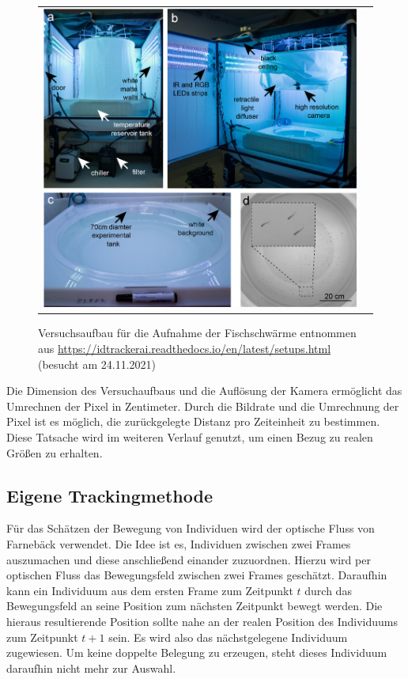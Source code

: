 \begin{figure}[H]
\centering
\begin{tabular}{cc}
\includegraphics[width=1.0\textwidth]{figures/Experimente/Tracking/Experimentaufbau.png} 

\end{tabular}
\caption{Versuchsaufbau für die Aufnahme der Fischschwärme entnommen aus \url{https://idtrackerai.readthedocs.io/en/latest/setups.html} (besucht am 24.11.2021) \label{fig:Versuchsaufbau}  }
\end{figure}

Die Dimension des Versuchaufbaus und die Auflösung der Kamera ermöglicht das Umrechnen der Pixel in Zentimeter.
Durch die Bildrate und die Umrechnung der Pixel ist es möglich, die zurückgelegte Distanz pro Zeiteinheit zu bestimmen.
Diese Tatsache wird im weiteren Verlauf genutzt, um einen Bezug zu realen Größen zu erhalten.

\subsection{Eigene Trackingmethode}

Für das Schätzen der Bewegung von Individuen wird der optische Fluss von Farnebäck verwendet. Die Idee ist es, Individuen zwischen zwei Frames auszumachen und diese anschließend einander zuzuordnen. Hierzu wird per optischen Fluss das Bewegungsfeld zwischen zwei Frames geschätzt. Daraufhin kann ein Individuum aus dem ersten Frame zum Zeitpunkt $t$ durch das Bewegungsfeld an seine Position zum nächsten Zeitpunkt bewegt werden. Die hieraus resultierende Position sollte nahe an der realen Position des Individuums zum Zeitpunkt $t+1$ sein. Es wird also das nächstgelegene Individuum zugewiesen. Um keine doppelte Belegung zu erzeugen, steht dieses Individuum daraufhin nicht mehr zur Auswahl.

